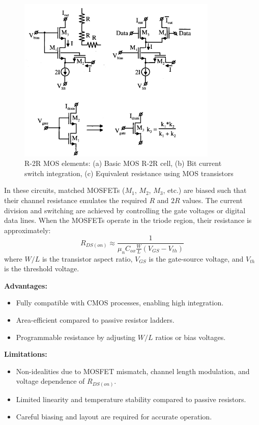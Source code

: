     \begin{figure}[h]
        \centering
        \includegraphics[width=0.85\textwidth]{figs/r2r_mos_elements.png}
        \caption{R-2R MOS elements: (a) Basic MOS R-2R cell, (b) Bit current switch integration, (c) Equivalent resistance using MOS transistors}
        \label{fig:r2r_mos_elements}
    \end{figure}

    In these circuits, matched MOSFETs ($M_1$, $M_2$, $M_3$, etc.) are biased such that their channel resistance emulates the required $R$ and $2R$ values. The current division and switching are achieved by controlling the gate voltages or digital data lines. When the MOSFETs operate in the triode region, their resistance is approximately:
    \begin{equation}
        R_{DS(on)} \approx \frac{1}{\mu_n C_{ox} \frac{W}{L} (V_{GS} - V_{th})}
    \end{equation}
    where $W/L$ is the transistor aspect ratio, $V_{GS}$ is the gate-source voltage, and $V_{th}$ is the threshold voltage.

    \textbf{Advantages:}
    \begin{itemize}
        \item Fully compatible with CMOS processes, enabling high integration.
        \item Area-efficient compared to passive resistor ladders.
        \item Programmable resistance by adjusting $W/L$ ratios or bias voltages.
    \end{itemize}

    \textbf{Limitations:}
    \begin{itemize}
        \item Non-idealities due to MOSFET mismatch, channel length modulation, and voltage dependence of $R_{DS(on)}$.
        \item Limited linearity and temperature stability compared to passive resistors.
        \item Careful biasing and layout are required for accurate operation.
    \end{itemize}

